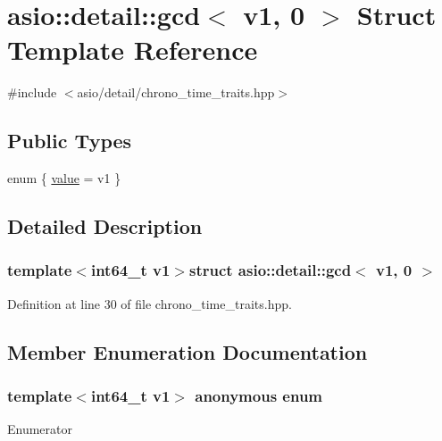 \hypertarget{structasio_1_1detail_1_1gcd_3_01v1_00_010_01_4}{}\section{asio\+:\+:detail\+:\+:gcd$<$ v1, 0 $>$ Struct Template Reference}
\label{structasio_1_1detail_1_1gcd_3_01v1_00_010_01_4}


{\ttfamily \#include $<$asio/detail/chrono\+\_\+time\+\_\+traits.\+hpp$>$}

\subsection*{Public Types}
\begin{DoxyCompactItemize}
\item 
enum \{ \hyperlink{structasio_1_1detail_1_1gcd_3_01v1_00_010_01_4_a5759d8e3df09ffa610b3b5485b002a0ea08105f221a988f57540225dc5d35b356}{value} = v1
 \}
\end{DoxyCompactItemize}


\subsection{Detailed Description}
\subsubsection*{template$<$int64\+\_\+t v1$>$struct asio\+::detail\+::gcd$<$ v1, 0 $>$}



Definition at line 30 of file chrono\+\_\+time\+\_\+traits.\+hpp.



\subsection{Member Enumeration Documentation}
\hypertarget{structasio_1_1detail_1_1gcd_3_01v1_00_010_01_4_a5759d8e3df09ffa610b3b5485b002a0e}{}\subsubsection[{anonymous enum}]{\setlength{\rightskip}{0pt plus 5cm}template$<$int64\+\_\+t v1$>$ anonymous enum}\label{structasio_1_1detail_1_1gcd_3_01v1_00_010_01_4_a5759d8e3df09ffa610b3b5485b002a0e}
\begin{Desc}
\item[Enumerator]\par
\begin{description}
\item[{\em 
\hypertarget{structasio_1_1detail_1_1gcd_3_01v1_00_010_01_4_a5759d8e3df09ffa610b3b5485b002a0ea08105f221a988f57540225dc5d35b356}{}value\label{structasio_1_1detail_1_1gcd_3_01v1_00_010_01_4_a5759d8e3df09ffa610b3b5485b002a0ea08105f221a988f57540225dc5d35b356}
}]\end{description}
\end{Desc}


